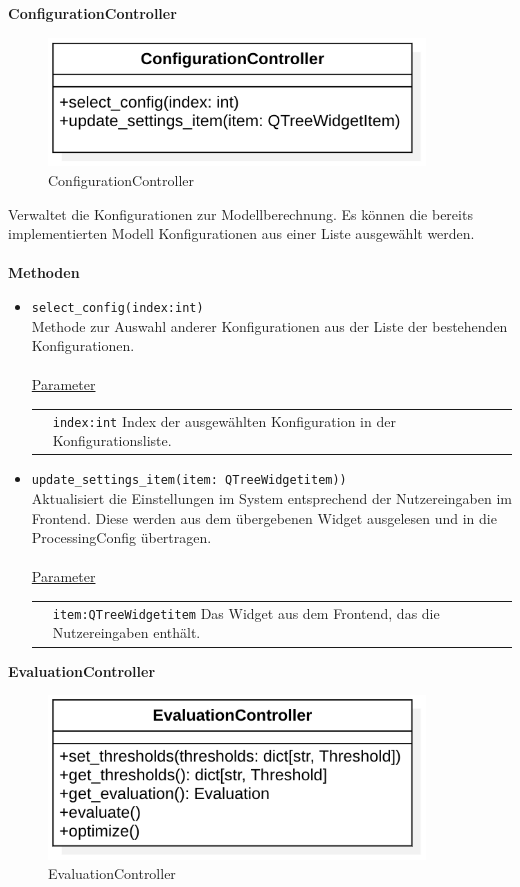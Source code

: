 \documentclass{article}
\begin{document}
\newpage
\textbf{\large{ConfigurationController}}
\begin{figure}[H]%
    \centering
    \includegraphics[width=10cm]{entwurf/Floriane/ConfigurationController.png}
    \caption{ConfigurationController}
\end{figure}

Verwaltet die Konfigurationen zur Modellberechnung. Es können die bereits implementierten Modell Konfigurationen aus einer Liste ausgewählt werden. \\\\
\textbf{\large{Methoden}}
\begin{itemize}
\item \texttt{select\_config(index:int)}\\ Methode zur Auswahl anderer Konfigurationen aus der Liste der bestehenden Konfigurationen.\\\\
\underline{{Parameter}}\\
\begin{tabular}{lp{10.7cm}}
 & \texttt{index:int} Index der ausgewählten Konfiguration in der Konfigurationsliste. \\
\end{tabular}
\item \texttt{update\_settings\_item(item: QTreeWidgetitem))}\\ Aktualisiert die Einstellungen im System entsprechend der Nutzereingaben im Frontend. Diese werden aus dem übergebenen Widget ausgelesen und in die ProcessingConfig übertragen.\\\\
\underline{{Parameter}}\\
\begin{tabular}{lp{10.7cm}}
 & \texttt{item:QTreeWidgetitem} Das Widget aus dem Frontend, das die Nutzereingaben enthält. \\
\end{tabular}
\end{itemize}


\newpage
\textbf{\large{EvaluationController}}
\begin{figure}[H]%
    \centering
    \includegraphics[width=10cm]{entwurf/Floriane/EvaluationController.png}
    \caption{EvaluationController}
\end{figure}
\end{document}
